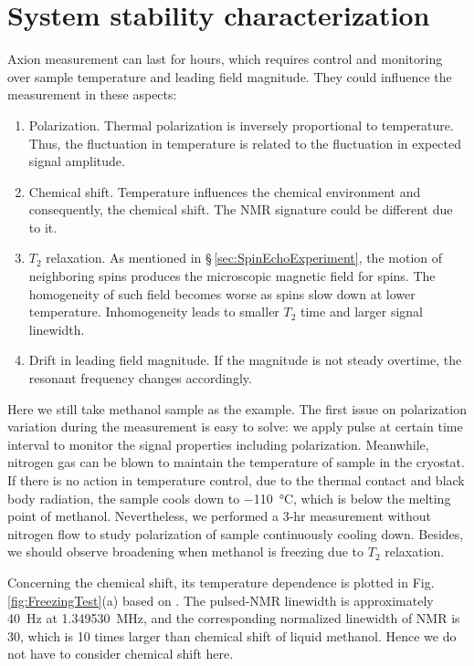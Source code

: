 \section{System stability characterization}\label{sec:stability}

Axion measurement can last for hours, which requires control and monitoring over sample temperature and leading field magnitude. They could influence the measurement in these aspects:
\begin{enumerate}
    \item Polarization. Thermal polarization is inversely proportional to temperature. Thus, the fluctuation in temperature is related to the fluctuation in expected signal amplitude. 
    \item Chemical shift. Temperature influences the chemical environment and consequently, the chemical shift. The NMR signature could be different due to it. 
    \item $T_2$ relaxation. As mentioned in \S\,\ref{sec:SpinEchoExperiment}, the motion of neighboring spins produces the microscopic magnetic field for spins. The homogeneity of such field becomes worse as spins slow down at lower temperature. Inhomogeneity leads to smaller $T_2$ time and larger signal linewidth. 
    \item Drift in leading field magnitude. If the magnitude is not steady overtime, the resonant frequency changes accordingly. 
\end{enumerate}

Here we still take methanol sample as the example. The first issue on polarization variation during the measurement is easy to solve: we apply pulse at certain time interval to monitor the signal properties including polarization. Meanwhile, nitrogen gas can be blown to maintain the temperature of sample in the cryostat. If there is no action in temperature control, due to the thermal contact and black body radiation, the sample cools down to \SI{-110}{\celsius}, which is below the melting point of methanol. Nevertheless, we performed a 3-hr measurement without nitrogen flow to study polarization of sample continuously cooling down. Besides, we should observe broadening when methanol is freezing due to $T_2$ relaxation. 

Concerning the chemical shift, its temperature dependence is plotted in Fig.\,\ref{fig:FreezingTest}(a) based on \cite{VanGeet_methanol, Geet1970CalibrationOM}. 
The pulsed-NMR linewidth is approximately \SI{40}{\Hz} at \SI{1.349530}{\MHz}, and the corresponding normalized linewidth of NMR is \SI{30}{\ppm}, which is 10 times larger than chemical shift of liquid methanol. Hence we do not have to consider chemical shift here. 

